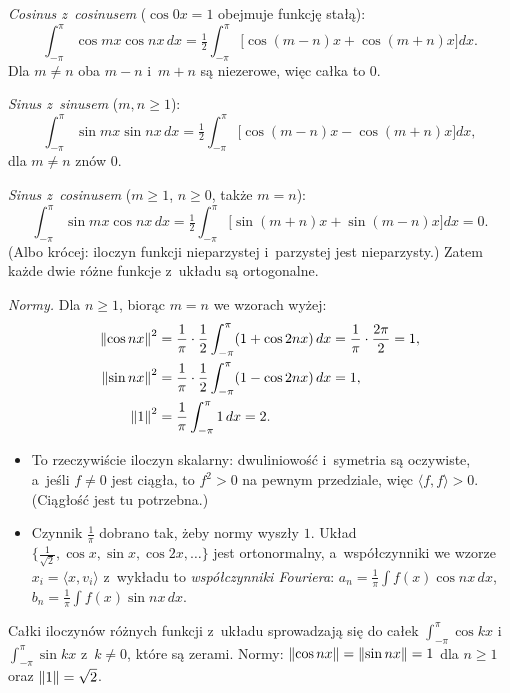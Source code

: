 \documentclass[11pt]{article}
\begin{document}
\emph{Cosinus z~cosinusem} ($\cos0x=1$ obejmuje funkcję stałą):
\[
\int_{-\pi}^{\pi}\!\cos mx\cos nx\,dx
=\tfrac12\!\int_{-\pi}^{\pi}\!\bigl[\cos(m-n)x+\cos(m+n)x\bigr]dx.
\]
Dla $m\ne n$ oba $m-n$ i~$m+n$ są niezerowe, więc całka to $0$.

\emph{Sinus z~sinusem} ($m,n\ge1$):
\[
\int_{-\pi}^{\pi}\!\sin mx\sin nx\,dx
=\tfrac12\!\int_{-\pi}^{\pi}\!\bigl[\cos(m-n)x-\cos(m+n)x\bigr]dx,
\]
dla $m\ne n$ znów $0$.

\emph{Sinus z~cosinusem} ($m\ge1$, $n\ge0$, także $m=n$):
\[
\int_{-\pi}^{\pi}\!\sin mx\cos nx\,dx
=\tfrac12\!\int_{-\pi}^{\pi}\!\bigl[\sin(m+n)x+\sin(m-n)x\bigr]dx=0.
\]
(Albo krócej: iloczyn funkcji nieparzystej i~parzystej jest nieparzysty.)
Zatem każde dwie różne funkcje z~układu są ortogonalne.

\emph{Normy.} Dla $n\ge1$, biorąc $m=n$ we wzorach wyżej:
\begin{align*}
\left\lVert \cos nx \right\rVert^2&=\frac1\pi\cdot\frac12\int_{-\pi}^{\pi}(1+\cos2nx)\,dx
=\frac1\pi\cdot\frac{2\pi}2=1,\\
\left\lVert \sin nx \right\rVert^2&=\frac1\pi\cdot\frac12\int_{-\pi}^{\pi}(1-\cos2nx)\,dx=1,\\
\left\lVert 1 \right\rVert^2&=\frac1\pi\int_{-\pi}^{\pi}1\,dx=2.
\end{align*}

\begin{uwaga}
\begin{itemize}
\item To rzeczywiście iloczyn skalarny: dwuliniowość i~symetria są
oczywiste, a~jeśli $f\ne0$ jest ciągła, to $f^2>0$ na pewnym przedziale,
więc $\langle f,f\rangle>0$. (Ciągłość jest tu potrzebna.)
\item Czynnik $\frac1\pi$ dobrano tak, żeby normy wyszły $1$. Układ
$\{\frac1{\sqrt2},\cos x,\sin x,\cos2x,\ldots\}$ jest ortonormalny,
a~współczynniki we wzorze $x_i=\langle x,v_i\rangle$ z~wykładu to
\emph{współczynniki Fouriera}: $a_n=\frac1\pi\int f(x)\cos nx\,dx$,
$b_n=\frac1\pi\int f(x)\sin nx\,dx$.
\end{itemize}
\end{uwaga}

\begin{odpowiedz}
Całki iloczynów różnych funkcji z~układu sprowadzają się do całek
$\int_{-\pi}^{\pi}\cos kx$ i~$\int_{-\pi}^{\pi}\sin kx$ z~$k\ne0$, które
są zerami. Normy: $\left\lVert \cos nx \right\rVert=\left\lVert \sin nx \right\rVert=1$ dla $n\ge1$ oraz
$\left\lVert 1 \right\rVert=\sqrt2$.
\end{odpowiedz}
\end{document}

